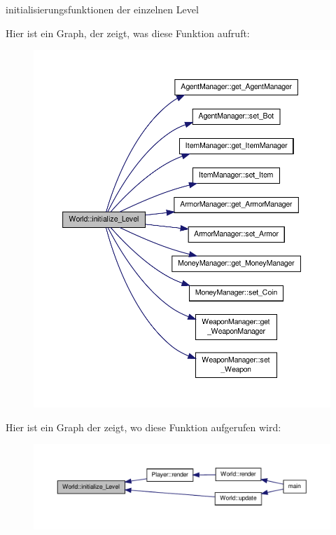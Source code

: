 initialisierungsfunktionen der einzelnen Level 



Hier ist ein Graph, der zeigt, was diese Funktion aufruft\-:
\nopagebreak
\begin{figure}[H]
\begin{center}
\leavevmode
\includegraphics[width=350pt]{class_world_a862716ca9282cf7f64522fd819427498_cgraph}
\end{center}
\end{figure}




Hier ist ein Graph der zeigt, wo diese Funktion aufgerufen wird\-:
\nopagebreak
\begin{figure}[H]
\begin{center}
\leavevmode
\includegraphics[width=350pt]{class_world_a862716ca9282cf7f64522fd819427498_icgraph}
\end{center}
\end{figure}


